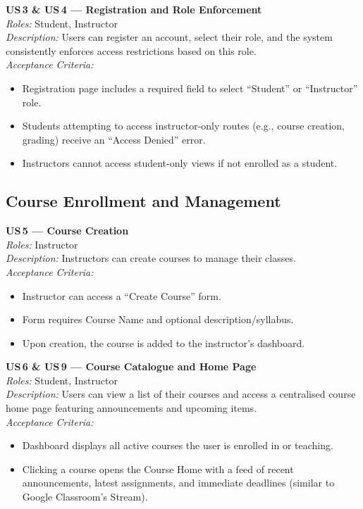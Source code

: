 \documentclass[12pt, a4paper]{article}
\begin{document}
\begin{userstory}
  \textbf{US\,3 \& US\,4 — Registration and Role Enforcement}\\[4pt]
  \textit{Roles:} Student, Instructor\\[2pt]
  \textit{Description:} Users can register an account, select their role,
  and the system consistently enforces access restrictions based on this
  role.\\[4pt]
  \textit{Acceptance Criteria:}
  \begin{itemize}
    \item Registration page includes a required field to select ``Student'' or
          ``Instructor'' role.
    \item Students attempting to access instructor-only routes (e.g., course
          creation, grading) receive an ``Access Denied'' error.
    \item Instructors cannot access student-only views if not enrolled as a
          student.
  \end{itemize}
\end{userstory}

\subsection{Course Enrollment and Management}

\begin{userstory}
  \textbf{US\,5 — Course Creation}\\[4pt]
  \textit{Roles:} Instructor\\[2pt]
  \textit{Description:} Instructors can create courses to manage their
  classes.\\[4pt]
  \textit{Acceptance Criteria:}
  \begin{itemize}
    \item Instructor can access a ``Create Course'' form.
    \item Form requires Course Name and optional description/syllabus.
    \item Upon creation, the course is added to the instructor's dashboard.
  \end{itemize}
\end{userstory}

\begin{userstory}
  \textbf{US\,6 \& US\,9 — Course Catalogue and Home Page}\\[4pt]
  \textit{Roles:} Student, Instructor\\[2pt]
  \textit{Description:} Users can view a list of their courses and access a
  centralised course home page featuring announcements and upcoming
  items.\\[4pt]
  \textit{Acceptance Criteria:}
  \begin{itemize}
    \item Dashboard displays all active courses the user is enrolled in or
          teaching.
    \item Clicking a course opens the Course Home with a feed of recent
          announcements, latest assignments, and immediate deadlines (similar
          to Google Classroom's Stream).
  \end{itemize}
\end{userstory}
\end{document}
